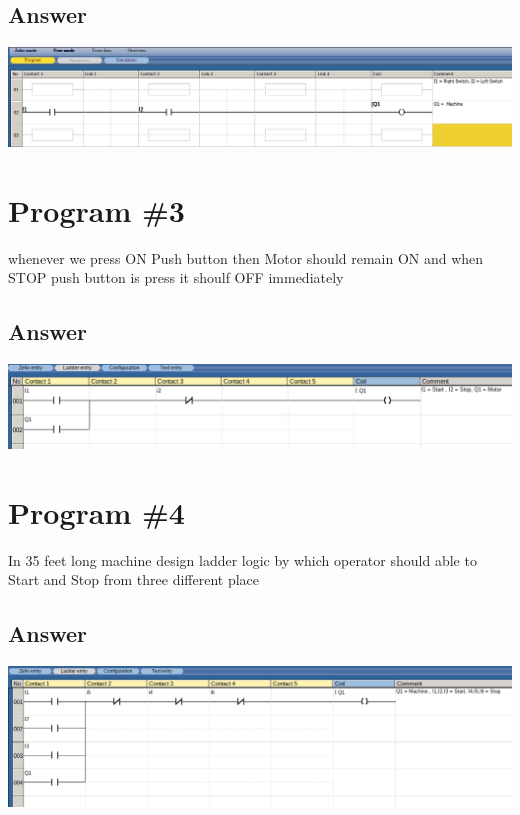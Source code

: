 \documentclass[
	12pt, %
]{fphw}
\begin{document}
  \subsection*{Answer}
  \begin{center}
    \includegraphics[width=165mm, scale=0.80]{prg2.png}
  \end{center}
\section*{Program \#3}
\medskip

\begin{problem}
 whenever we press ON Push button then Motor should remain ON and when STOP
 push button is press it shoulf OFF immediately
\end{problem}

\subsection*{Answer}
  \begin{center}
    \includegraphics[width=165mm, scale=0.80]{prg3.png}
  \end{center}
\section*{Program \#4}
\medskip
\begin{problem}
  In 35 feet long machine design ladder logic by which operator should able to
  Start and Stop from three different place 
\end{problem}

\subsection*{Answer}
\begin{center}
  \includegraphics[width=165mm, scale=0.80]{prg4.png}
\end{center}
\end{document}
